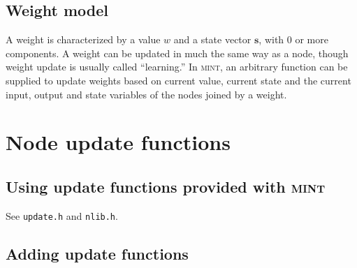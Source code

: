 \documentclass[12pt,letterpaper]{memoir}
\newcommand{\mint}{{\scshape\sffamily mint}\xspace}
\renewcommand{\vec}[1]{\ensuremath{\mathbf#1}\xspace}
\begin{document}
\subsection{Weight model}
\label{sec:weightmodel}
A weight is characterized by a value $w$ and a state vector $\vec s$,
with 0 or more components. A weight can be updated in much the same
way as a node, though weight update is usually called ``learning.''
In \mint, an arbitrary function can be supplied to update weights
based on current value, current state and the current input, output
and state variables of the nodes joined by a weight.

\section{Node update functions}
\label{sec:nupdate}

\subsection{Using update functions provided with \mint}
\label{sec:update-using}

See \lstinline{update.h} and \lstinline{nlib.h}.

\subsection{Adding update functions}
\label{sec:update-adding}
\end{document}
